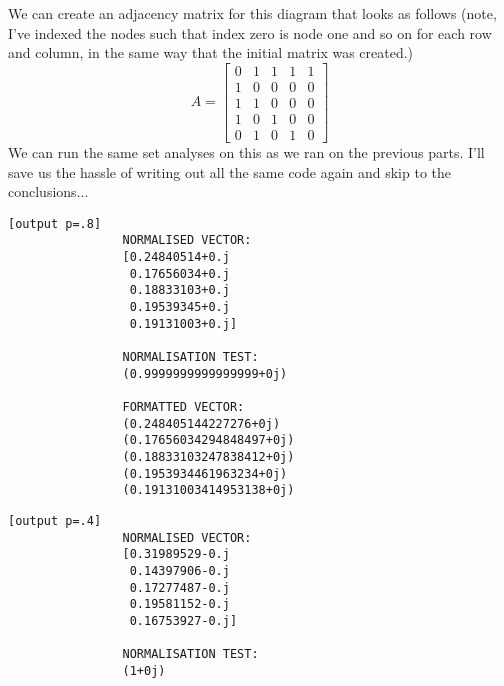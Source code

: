\documentclass[11pt]{article}
\begin{document}
\begin{enumerate}
        We can create an adjacency matrix for this diagram that looks as
        follows (note, I've indexed the nodes such that index zero is node one
        and so on for each row and column, in the same way that the initial
        matrix was created.)
        \[
            A = 
            \begin{bmatrix}
                0   &   1   &   1   &   1   &   1   \\
                1   &   0   &   0   &   0   &   0   \\
                1   &   1   &   0   &   0   &   0   \\
                1   &   0   &   1   &   0   &   0   \\
                0   &   1   &   0   &   1   &   0
            \end{bmatrix}
        \]
        We can run the same set analyses on this as we ran on the previous
        parts. I'll save us the hassle of writing out all the same code again
        and skip to the conclusions...

        \begin{minipage}[t]{0.48\linewidth}
            \begin{lstlisting}[basicstyle=\ttfamily\footnotesize, gobble=8]
            [output p=.8]
                NORMALISED VECTOR:
                [0.24840514+0.j 
                 0.17656034+0.j 
                 0.18833103+0.j 
                 0.19539345+0.j
                 0.19131003+0.j]

                NORMALISATION TEST:
                (0.9999999999999999+0j)
                
                FORMATTED VECTOR:
                (0.248405144227276+0j)
                (0.17656034294848497+0j)
                (0.18833103247838412+0j)
                (0.1953934461963234+0j)
                (0.19131003414953138+0j)
            \end{lstlisting}
        \end{minipage} \hfill \vline \hfill%
        \begin{minipage}[t]{0.48\linewidth}
            \begin{lstlisting}[basicstyle=\ttfamily\footnotesize, gobble=8]
            [output p=.4]
                NORMALISED VECTOR:
                [0.31989529-0.j 
                 0.14397906-0.j 
                 0.17277487-0.j 
                 0.19581152-0.j
                 0.16753927-0.j] 

                NORMALISATION TEST:
                (1+0j)
                

\end{lstlisting}
\end{minipage}
\end{enumerate}
\end{document}
